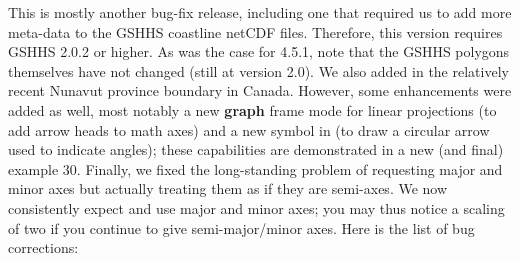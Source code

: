This is mostly another bug-fix release, including one that required us to add more meta-data
to the GSHHS coastline netCDF files.  Therefore, this version requires GSHHS 2.0.2 or higher.
As was the case for 4.5.1, note that the GSHHS polygons themselves have not changed (still at version 2.0).
We also added in the relatively recent Nunavut province boundary in Canada.
However, some enhancements were added as well, most notably a new {\bf graph} frame mode for linear
projections (to add arrow heads to math axes) and a new symbol in  (to draw a
circular arrow used to indicate angles); these capabilities are demonstrated in a new (and final) example 30.
Finally, we fixed the long-standing problem of   requesting major and minor axes but
actually treating them as if they are semi-axes.  We now consistently expect and use major and minor axes;
you may thus notice a scaling of two if you continue to give semi-major/minor axes.
Here is the list of bug corrections:
